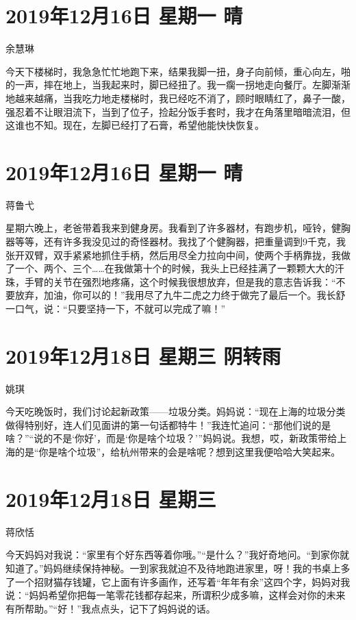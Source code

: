 \section{2019年12月16日 星期一 晴}

余慧琳

今天下楼梯时，我急急忙忙地跑下来，结果我脚一扭，身子向前倾，重心向左，啪的一声，摔在地上，当我起来时，脚已经扭了。我一瘸一拐地走向餐厅。左脚渐渐地越来越痛，当我吃力地走楼梯时，我已经吃不消了，顾时眼睛红了，鼻子一酸，强忍着不让眼泪流下，当到了位子，捡起分饭手套时，我才在角落里暗暗流泪，但这谁也不知。现在，左脚已经打了石膏，希望他能快快恢复。

\section{2019年12月16日 星期一 晴}

蒋鲁弋

星期六晚上，老爸带着我来到健身房。我看到了许多器材，有跑步机，哑铃，健胸器等等，还有许多我没见过的奇怪器材。我找了个健胸器，把重量调到9千克，我张开双臂，双手紧紧地抓住手柄，然后用尽全力拉向中间，使两个手柄靠拢，我做了一个、两个、三个\ldots\ldots 在我做第十个的时候，我头上已经挂满了一颗颗大大的汗珠，手臂的关节在强烈地疼痛，这个时候我很想放弃，但是我的意志告诉我：``不要放弃，加油，你可以的！''我用尽了九牛二虎之力终于做完了最后一个。我长舒一口气，说：``只要坚持一下，不就可以完成了嘛！''

\section{2019年12月18日 星期三 阴转雨}

姚琪

今天吃晚饭时，我们讨论起新政策------垃圾分类。妈妈说：``现在上海的垃圾分类做得特别好，连人们见面讲的第一句话都特牛！''我连忙追问：``那他们说的是啥？''``说的不是`你好'，而是`你是啥个垃圾？'''妈妈说。我想，哎，新政策带给上海的是``你是啥个垃圾''，给杭州带来的会是啥呢？想到这里我便哈哈大笑起来。

\section{2019年12月18日 星期三}

蒋欣恬

今天妈妈对我说：``家里有个好东西等着你哦。''``是什么？''我好奇地问。``到家你就知道了。''妈妈继续保持神秘。一到家我就迫不及待地跑进家里，呀！我的书桌上多了一个招财猫存钱罐，它上面有许多画作，还写着``年年有余''这四个字，妈妈对我说：``妈妈希望你把每一笔零花钱都存起来，所谓积少成多嘛，这样会对你的未来有所帮助。''``好！''我点点头，记下了妈妈说的话。

